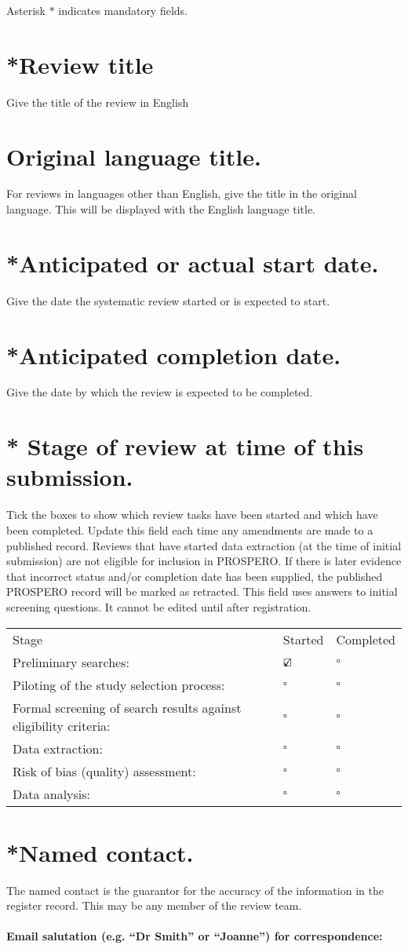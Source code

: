 \documentclass[11pt,letterpaper]{article}
\newcommand*{\checkedbox}{$\text{\rlap{$\checkmark$}}\square $\ }%
\newcommand{\homework}[5]{
	\noindent
	\begin{center}
		\framebox{
			\vbox{
				\hbox to 5.78in { {\bf  } \hfill #2 }
				\vspace{4mm}
				\hbox to 5.78in { {\Large \hfill PROSPERO Application Form  \hfill} }
				\vspace{4mm}
			}
		}
	\end{center}
	\vspace*{4mm}
}
\newcommand{\dataitem}[2]{
	\section{#1}
	\textcolor{codegray}{#2} \\
}
\begin{document}
	
	
	\homework{5}{\today}{}{}{}
	Asterisk $*$  indicates mandatory fields.

	\dataitem{*Review title}{Give the title of the review in English}
	
	
	\dataitem{Original language title.}{For reviews in languages other than English, give the title in the original language. This will be displayed with the English language title.}
		
	
	\dataitem{*Anticipated or actual start date.}{Give the date the systematic review started or is expected to start.}
		
		
	\dataitem{*Anticipated completion date.}{Give the date by which the review is expected to be completed.}
		
		
	\dataitem{* Stage of review at time of this submission.}{
		Tick the boxes to show which review tasks have been started and which have been completed. Update this field each time any amendments are made to a published record. Reviews that have started data extraction (at the time of initial submission) are not eligible for inclusion in PROSPERO. If there is later evidence that incorrect status and/or completion date has been supplied, the published PROSPERO record will be marked as retracted.
		This field uses answers to initial screening questions. It cannot be edited until after registration.}
	
	\begin{tabular}{ p{8 cm}p{5.5cm} p{5.5cm}}
		Stage  & Started &Completed \\
		Preliminary searches: & \checkedbox & $\square$ \\
		Piloting of the study selection process: & $\square$  & $\square$ \\
		Formal screening of search results against eligibility criteria: & $\square$  & $\square$ \\
		Data extraction: & $\square$  & $\square$ \\
		Risk of bias (quality) assessment: & $\square$  & $\square$ \\
		Data analysis: & $\square$  & $\square$ \\
	\end{tabular}

	\dataitem{*Named contact.}{The named contact is the guarantor for the accuracy of the information in the register record. This may be any member of the review team.}
	\paragraph{Email salutation (e.g. ``Dr Smith'' or ``Joanne'') for correspondence:}
\end{document}
